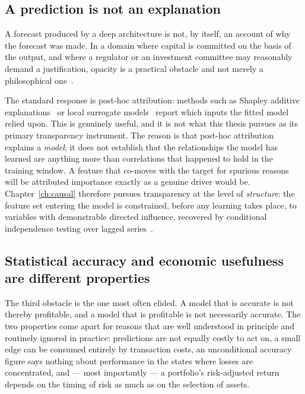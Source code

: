 \subsection{A prediction is not an explanation}

A forecast produced by a deep architecture is not, by itself, an account of why the forecast
was made. In a domain where capital is committed on the basis of the output, and where a
regulator or an investment committee may reasonably demand a justification, opacity is a
practical obstacle and not merely a philosophical one~\cite{koa2024,lundberg2017}.

The standard response is post-hoc attribution: methods such as Shapley additive
explanations~\cite{lundberg2017} or local surrogate models~\cite{ribeiro2016} report which
inputs the fitted model relied upon. This is genuinely useful, and it is not what this thesis
pursues as its primary transparency instrument. The reason is that post-hoc attribution
explains a \emph{model}; it does not establish that the relationships the model has learned
are anything more than correlations that happened to hold in the training window. A feature
that co-moves with the target for spurious reasons will be attributed importance exactly as
a genuine driver would be. Chapter~\ref{ch:causal} therefore pursues transparency at the level
of \emph{structure}: the feature set entering the model is constrained, before any learning
takes place, to variables with demonstrable directed influence, recovered by conditional
independence testing over lagged series~\cite{spirtes2000,granger1969,xu2026causal}.

\subsection{Statistical accuracy and economic usefulness are different properties}

The third obstacle is the one most often elided. A model that is accurate is not thereby
profitable, and a model that is profitable is not necessarily accurate. The two properties
come apart for reasons that are well understood in principle and routinely ignored in
practice: predictions are not equally costly to act on, a small edge can be consumed entirely
by transaction costs, an unconditional accuracy figure says nothing about performance in the
states where losses are concentrated, and --- most importantly --- a portfolio's risk-adjusted
return depends on the timing of risk as much as on the selection of assets.

